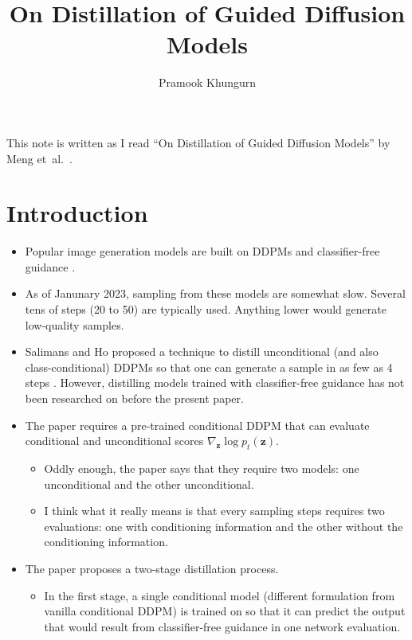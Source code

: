 \documentclass[10pt]{article}
\title{On Distillation of Guided Diffusion Models}
\author{Pramook Khungurn}
\newcommand{\ve}[1]{\mathbf{#1}}
\newcommand{\etal}{{et~al.}}
\begin{document}
\maketitle

This note is written as I read ``On Distillation of Guided Diffusion Models'' by Meng \etal~\cite{Meng:2022}.

\section{Introduction}

\begin{itemize}
  \item Popular image generation models are built on DDPMs \cite{Ho:2020} and classifier-free guidance \cite{Ho:2022}.
  
  \item As of Janunary 2023, sampling from these models are somewhat slow. Several tens of steps (20 to 50) are typically used. Anything lower would generate low-quality samples.
  
  \item Salimans and Ho proposed a technique to distill unconditional (and also class-conditional) DDPMs so that one can generate a sample in as few as 4 steps \cite{Salimans:2022}. However, distilling models trained with classifier-free guidance has not been researched on before the present paper.
  
  \item The paper requires a pre-trained conditional DDPM that can evaluate conditional and unconditional scores $\nabla_{\ve{z}} \log p_t(\ve{z})$.
  \begin{itemize}
    \item Oddly enough, the paper says that they require two models: one unconditional and the other unconditional.
    \item I think what it really means is that every sampling steps requires two evaluations: one with conditioning information and the other without the conditioning information.
  \end{itemize}

  \item The paper proposes a two-stage distillation process.
  \begin{itemize}
    \item In the first stage, a single conditional model (different formulation from vanilla conditional DDPM) is trained on so that it can predict the output that would result from classifier-free guidance in one network evaluation.
    

\end{itemize}
\end{itemize}
\end{document}
